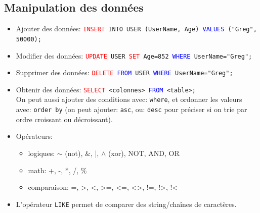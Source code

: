 \documentclass[a4paper]{article}
\begin{document}
\subsection{Manipulation des données}





\begin{itemize}



\item Ajouter des données: \texttt{\textcolor{red}{INSERT} INTO USER (UserName, Age) \textcolor{blue}{VALUES} ("Greg", 50000);}



\item Modifier des données: \texttt{\textcolor{red}{UPDATE} USER \textcolor{red}{SET} Age=852 \textcolor{blue}{WHERE} UserName="Greg";}



\item Supprimer des données: \texttt{\textcolor{red}{DELETE} \textcolor{blue}{FROM} USER \textcolor{blue}{WHERE} UserName="Greg";}



\item Obtenir des données: \texttt{\textcolor{red}{SELECT} <colonnes> \textcolor{blue}{FROM} <table>;} \\
On peut aussi ajouter des conditions avec: \texttt{where}, et ordonner les valeurs avec: \texttt{order by} (on peut ajouter: \texttt{asc}, ou: \texttt{desc} pour préciser si on trie par ordre croissant ou décroissant).



\item Opérateurs:
\begin{itemize}
    \item logiques: $\sim$ (not), \&, |, $\wedge$ (xor), NOT, AND, OR
    \item math: \; +, \; -, \; *, \; /, \; \%
    \item comparaison: \; =, \; >, \; <, \; >=, \; <=, \; <>, \; !=, \; !>, \; !<
\end{itemize}



\item L'opérateur \texttt{LIKE} permet de comparer des string/chaînes de caractères.
\begin{example}
    \begin{itemize}


\end{itemize}
\end{example}
\end{itemize}
\end{document}
